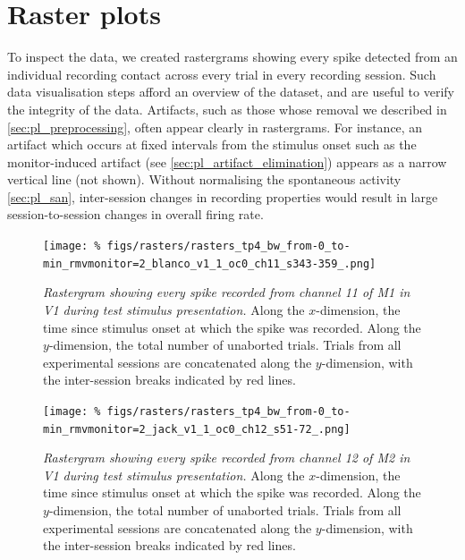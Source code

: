 \FloatBarrier
\section{Raster plots}
\label{sec:pl_rasters}

To inspect the data, we created rastergrams showing every spike detected from an individual recording contact across every trial in every recording session.
Such data visualisation steps afford an overview of the dataset, and are useful to verify the integrity of the data.
Artifacts, such as those whose removal we described in \autoref{sec:pl_preprocessing}, often appear clearly in rastergrams.
For instance, an artifact which occurs at fixed intervals from the stimulus onset such as the monitor-induced artifact (see \autoref{sec:pl_artifact_elimination}) appears as a narrow vertical line (not shown).
Without normalising the spontaneous activity \autoref{sec:pl_san}, inter-session changes in recording properties would result in large session-to-session changes in overall firing rate.


\begin{figure}[p]
    \centering
    \texttt{[image: \%
figs/rasters/rasters\_tp4\_bw\_from-0\_to-min\_rmvmonitor=2\_blanco\_v1\_1\_oc0\_ch11\_s343-359\_.png]}
    \caption{\textit{Rastergram showing every spike recorded from channel \num{11} of \ac{M1} in \ac{V1} during test stimulus presentation.}
    Along the $x$-dimension, the time since stimulus onset at which the spike was recorded.
    Along the $y$-dimension, the total number of unaborted trials.
    Trials from all experimental sessions are concatenated along the $y$-dimension, with the inter-session breaks indicated by red lines.
}
    \label{fig:raster_blanco_v1}
\end{figure}


\begin{figure}[p]
    \centering
    \texttt{[image: \%
figs/rasters/rasters\_tp4\_bw\_from-0\_to-min\_rmvmonitor=2\_jack\_v1\_1\_oc0\_ch12\_s51-72\_.png]}
    \caption{\textit{Rastergram showing every spike recorded from channel \num{12} of \ac{M2} in \ac{V1} during test stimulus presentation.}
    Along the $x$-dimension, the time since stimulus onset at which the spike was recorded.
    Along the $y$-dimension, the total number of unaborted trials.
    Trials from all experimental sessions are concatenated along the $y$-dimension, with the inter-session breaks indicated by red lines.
}
    \label{fig:raster_jack_v1}
\end{figure}


